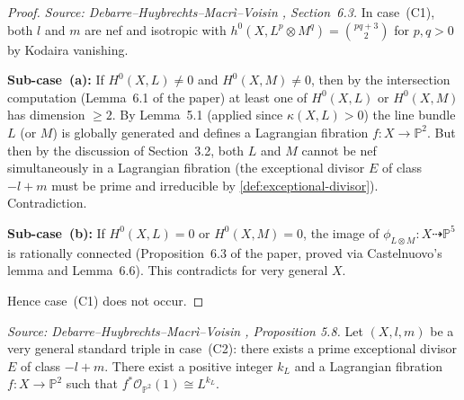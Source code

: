 \begin{proof}
  \textit{Source: Debarre--Huybrechts--Macr\`i--Voisin \cite{MR4654610}, Section~6.3.}
  In case~(C1), both \(l\) and \(m\) are nef and isotropic with
  \(h^0(X, L^p \otimes M^q) = \binom{pq+3}{2}\) for \(p, q > 0\) by Kodaira vanishing.

  \textbf{Sub-case~(a):} If \(H^0(X,L) \ne 0\) and \(H^0(X,M) \ne 0\), then by the
  intersection computation (Lemma~6.1 of the paper) at least one of
  \(H^0(X,L)\) or \(H^0(X,M)\) has dimension \(\ge 2\).  By Lemma~5.1 (applied since
  \(\kappa(X,L) > 0\)) the line bundle \(L\) (or \(M\)) is globally generated and defines
  a Lagrangian fibration \(f \colon X \to \mathbb{P}^2\).  But then by the discussion
  of Section~3.2, both \(L\) and \(M\) cannot be nef simultaneously in a Lagrangian
  fibration (the exceptional divisor \(E\) of class \(-l+m\) must be prime and irreducible
  by \cref{def:exceptional-divisor}).  Contradiction.

  \textbf{Sub-case~(b):} If \(H^0(X,L) = 0\) or \(H^0(X,M) = 0\), the image of
  \(\phi_{L \otimes M} \colon X \dashrightarrow \mathbb{P}^5\) is rationally connected
  (Proposition~6.3 of the paper, proved via Castelnuovo's lemma and Lemma~6.6).
  This contradicts \cite[Theorem~4.2]{voisinfib} for very general \(X\).

  Hence case~(C1) does not occur.
\end{proof}

\begin{proposition}
  \label{prop:divisorial-contraction}
  \textit{Source: Debarre--Huybrechts--Macr\`i--Voisin \cite{MR4654610}, Proposition 5.8.}
  Let \((X, l, m)\) be a very general standard triple in case~(C2): there exists a prime
  exceptional divisor \(E\) of class \(-l + m\).  There exist a positive integer
  \(k_L\) and a Lagrangian fibration \(f \colon X \to \mathbb{P}^2\) such that
  \(f^*\mathcal{O}_{\mathbb{P}^2}(1) \cong L^{k_L}\).
\end{proposition}

